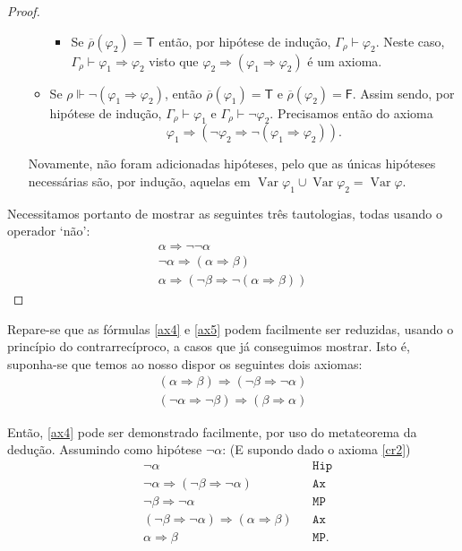 \documentclass{report}
\theoremstyle{definition}
\theoremstyle{remark}
\newcommand{\lt}{\mathsf{T}}
\newcommand{\lf}{\mathsf{F}}
\DeclareMathOperator{\var}{Var}
\newcommand{\imply}{\mathbin{\Rightarrow}}
\begin{document}
\begin{proof}
\begin{itemize}
\begin{itemize}
\begin{itemize}
	\item Se $\overline\rho(\varphi_2) = \lt$ então, por hipótese de indução, $\Gamma_\rho \vdash \varphi_2$. Neste caso, $\Gamma_\rho \vdash \varphi_1 \imply \varphi_2$ visto que $\varphi_2 \imply (\varphi_1 \imply \varphi_2)$ é um axioma.
	\end{itemize}
	
	\item Se $\rho \Vdash \neg (\varphi_1 \imply \varphi_2)$, então $\overline\rho(\varphi_1) = \lt$ e $\overline\rho(\varphi_2) = \lf$. Assim sendo, por hipótese de indução, $\Gamma_\rho \vdash \varphi_1$ e $\Gamma_\rho \vdash \neg \varphi_2$. Precisamos então do axioma
	\[\varphi_1 \imply (\neg \varphi_2 \imply \neg (\varphi_1 \imply \varphi_2)).\]
	\end{itemize}
	
	Novamente, não foram adicionadas hipóteses, pelo que as únicas hipóteses necessárias são, por indução, aquelas em $\var \varphi_1 \cup \var \varphi_2 = \var \varphi$.
	\end{itemize}
	
	Necessitamos portanto de mostrar as seguintes três tautologias, todas usando o operador `não':
	\begin{gather}
	\alpha \imply \neg \neg \alpha\label{ax3}\\
	\neg \alpha \imply (\alpha \imply \beta)\label{ax4}\\
	\alpha \imply (\neg \beta \imply \neg (\alpha \imply \beta))\label{ax5}
	\end{gather}
	
	\end{proof}
	
	Repare-se que as fórmulas \eqref{ax4} e \eqref{ax5} podem facilmente ser reduzidas, usando o princípio do contrarrecíproco, a casos que já conseguimos mostrar. Isto é, suponha-se que temos ao nosso dispor os seguintes dois axiomas:
	\begin{gather}
	(\alpha \imply \beta) \imply (\neg \beta \imply \neg \alpha)\label{cr1}\\
	(\neg \alpha \imply \neg \beta) \imply (\beta \imply \alpha)\label{cr2}
	\end{gather}
	
	Então, \eqref{ax4} pode ser demonstrado facilmente, por uso do metateorema da dedução. Assumindo como hipótese $\neg \alpha$: (E supondo dado o axioma \eqref{cr2})
	\begin{align*}
	&\neg \alpha&&\texttt{Hip}\\
	&\neg \alpha \imply (\neg \beta \imply \neg \alpha)&&\texttt{Ax}\\
	&\neg \beta \imply \neg \alpha&&\texttt{MP}\\
	&(\neg \beta \imply \neg \alpha) \imply (\alpha \imply \beta)&&\texttt{Ax}\\
	&\alpha \imply \beta&&\texttt{MP}.
	\end{align*}
	
\end{document}
